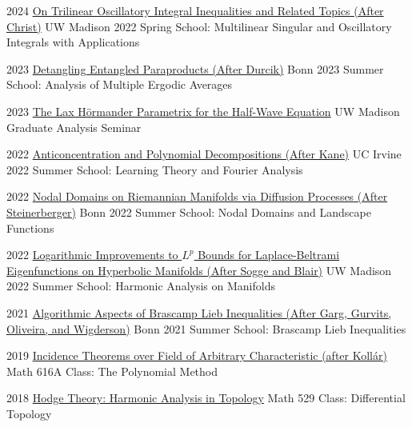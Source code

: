 \documentclass[a4paper]{cv-friggeri}
\begin{document}
\begin{entrylist}

\entry
{2024}
{\href{https://github.com/jdjake/Notes/raw/master/Talks/TalkNotes/DensonRaiChoudhuri.pdf}{On Trilinear Oscillatory Integral Inequalities and Related Topics (After Christ)}}
{}
{UW Madison 2022 Spring School: Multilinear Singular and Oscillatory Integrals with Applications}

\entry
{2023}
{\href{https://github.com/jdjake/Notes/raw/master/Talks/TalkNotes/DecouplingEntangledParaproducts.pdf}{Detangling Entangled Paraproducts (After Durcik)}}
{}
{Bonn 2023 Summer School: Analysis of Multiple Ergodic Averages}

\entry
{2023}
{\href{https://github.com/jdjake/Notes/raw/master/Talks/TalkNotes/LaxParametrix.pdf}{The Lax H\"{o}rmander Parametrix for the Half-Wave Equation}}
{}
{UW Madison Graduate Analysis Seminar}

\entry
{2022}
{\href{https://github.com/jdjake/Notes/raw/master/Talks/TalkNotes/AnticoncentrationPolynomialDecompositions.pdf}{Anticoncentration and Polynomial Decompositions (After Kane)}}
{}
{UC Irvine 2022 Summer School: Learning Theory and Fourier Analysis}

\entry
{2022}
{\href{https://github.com/jdjake/Notes/raw/master/Talks/TalkNotes/NodalGeometryAndBrownianMotion.pdf}{Nodal Domains on Riemannian Manifolds via Diffusion Processes (After Steinerberger)}}
{}
{Bonn 2022 Summer School: Nodal Domains and Landscape Functions}

\entry
{2022}
{\href{https://github.com/jdjake/Notes/raw/master/Talks/TalkNotes/LogarithmicImprovementsSpectralBands.pdf}{Logarithmic Improvements to $L^p$ Bounds for Laplace-Beltrami Eigenfunctions on Hyperbolic Manifolds (After Sogge and Blair)}}
{}
{UW Madison 2022 Summer School: Harmonic Analysis on Manifolds}

\entry
{2021}
{\href{https://github.com/jdjake/Notes/raw/master/Talks/TalkNotes/RankDecreasingAndCapacity.pdf}{Algorithmic Aspects of Brascamp Lieb Inequalities (After Garg, Gurvits, Oliveira, and Wigderson)}}
{}
{Bonn 2021 Summer School: Brascamp Lieb Inequalities}

\entry
{2019}
{\href{https://github.com/jdjake/Notes/raw/master/Talks/TalkNotes/SzemerediTrotterin3D.pdf}{Incidence Theorems over Field of Arbitrary Characteristic (after Koll\'{a}r)}}
{}
{Math 616A Class: The Polynomial Method}

\entry
{2018}
{\href{https://github.com/jdjake/Notes/raw/master/Talks/TalkNotes/HodgeTheory.pdf}{Hodge Theory: Harmonic Analysis in Topology}}
{}
{Math 529 Class: Differential Topology}


\end{entrylist}
\end{document}
